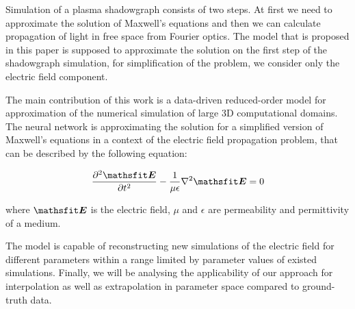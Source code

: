 \documentclass{article} %
\begin{document}
Simulation of a plasma shadowgraph consists of two steps.
At first we need to approximate the solution of Maxwell's equations and then we can calculate propagation of light in free space from Fourier optics. The model that is proposed in this paper is supposed to approximate the solution on the first step of the shadowgraph simulation, for simplification of the problem, we consider only the electric field component.

The main contribution of this work is a data-driven reduced-order model for approximation of the numerical simulation of large 3D computational domains. The neural network is approximating the solution for a simplified version of Maxwell's equations in a context of the electric field propagation problem, that can be described by the following equation:

\begin{equation*}\label{eq:ewave}
    \displaystyle \frac{\partial^2\displaystyle \tE}{\partial t^2} - \displaystyle \frac{1}{\mu\epsilon}\displaystyle\nabla^2\displaystyle \tE = 0
\end{equation*}

where $\displaystyle \tE$ is the electric field, $\displaystyle \mu$ and $\displaystyle \epsilon$ are permeability and permittivity of a medium.

The model is capable of reconstructing new simulations of the electric field for different parameters within a range limited by parameter values of existed simulations. Finally, we will be analysing the applicability of our approach for interpolation as well as extrapolation in parameter space compared to ground-truth data. 
\end{document}
